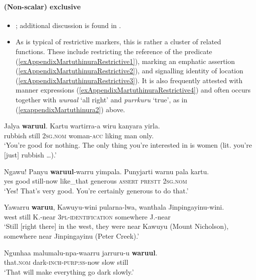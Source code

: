 \paragraph{(Non-scalar) exclusive}
\label{appendixMartuthuniraRestrictive}
\begin{itemize}
	\item \textcite[130–131]{Dench1994}; additional discussion is found in \textcite{SchultzeBerndt2002}.
	\item As is typical of restrictive markers, this is rather a cluster of related functions. These include restricting the reference of the predicate (\ref{exAppendixMartuthinuraRestrictive1}), marking an emphatic assertion (\ref{exAppendixMartuthinuraRestrictive2}), and signalling identity of location (\ref{exAppendixMartuthinuraRestrictive3}). It is also frequently attested with manner expressions (\ref{exAppendixMartuthinuraRestrictive4}) and often occurs together with \textit{wuraal} \lq all right' and \textit{purrkuru} \lq true', as in (\ref{exappendixMartuthinura2}) above.
\end{itemize}
\begin{exe}
		\ex\label{exAppendixMartuthinuraRestrictive1}
		\gll Jalya \textbf{waruul}. Kartu wartirra-a wiru kanyara yirla.\\
		rubbish still 2\textsc{sg}.\textsc{nom} woman-\textsc{acc} liking man only.\\
		\glt \lq You're good for nothing. The only thing you're interested in is women (lit. you're [just] rubbish …).\rq{ }\parencite[286]{Dench1994}
		
			\ex\label{exAppendixMartuthinuraRestrictive2}
	\gll Ngawu! Panyu \textbf{waruul}-warru yimpala. Punyjarti warnu pala kartu. \\
	yes good still-now like\_that generous \textsc{assert}  \textsc{prestt} 2\textsc{sg}.\textsc{nom}\\
	\glt \lq Yes! That's very good. You're certainly generous to do that.\rq{ }\parencite[275]{Dench1994}
	
		\ex\label{exAppendixMartuthinuraRestrictive3}
		\gll Yawarru \textbf{waruu}, Kawuyu-wini pularna-lwa, wanthala Jinpingayinu-wini.\\
		west still K.-near 3\textsc{pl}-\textsc{identification} somewhere J.-near\\
		\glt \lq{}Still [right there] in the west, they were near Kawuyu (Mount Nicholson), somewhere near Jinpingayinu (Peter Creek).'\\
		\parencite[81]{Dench1994}
		
		\ex\label{exAppendixMartuthinuraRestrictive4}
		\gll Ngunhaa malumalu-npa-waarru jarruru-u \textbf{waruul}.\\
		that.\textsc{nom} dark-\textsc{inch}-\textsc{purp}:\textsc{ss}-now slow still\\
		\glt \lq That will make everything go dark slowly.' \parencite[254]{Dench1994}
\end{exe}

